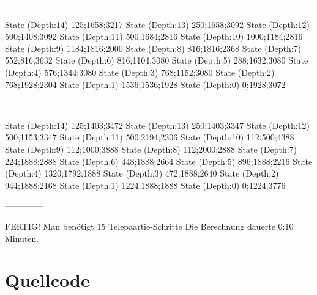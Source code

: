 \documentclass[a4paper,10pt,ngerman]{scrartcl}
\begin{document}
\begin{lstcs}
--------------

State (Depth:14) {125;1658;3217}
State (Depth:13) {250;1658;3092}
State (Depth:12) {500;1408;3092}
State (Depth:11) {500;1684;2816}
State (Depth:10) {1000;1184;2816}
State (Depth:9) {1184;1816;2000}
State (Depth:8) {816;1816;2368}
State (Depth:7) {552;816;3632}
State (Depth:6) {816;1104;3080}
State (Depth:5) {288;1632;3080}
State (Depth:4) {576;1344;3080}
State (Depth:3) {768;1152;3080}
State (Depth:2) {768;1928;2304}
State (Depth:1) {1536;1536;1928}
State (Depth:0) {0;1928;3072}

--------------

State (Depth:14) {125;1403;3472}
State (Depth:13) {250;1403;3347}
State (Depth:12) {500;1153;3347}
State (Depth:11) {500;2194;2306}
State (Depth:10) {112;500;4388}
State (Depth:9) {112;1000;3888}
State (Depth:8) {112;2000;2888}
State (Depth:7) {224;1888;2888}
State (Depth:6) {448;1888;2664}
State (Depth:5) {896;1888;2216}
State (Depth:4) {1320;1792;1888}
State (Depth:3) {472;1888;2640}
State (Depth:2) {944;1888;2168}
State (Depth:1) {1224;1888;1888}
State (Depth:0) {0;1224;3776}

--------------


FERTIG!
Man benötigt 15 Telepaartie-Schritte
Die Berechnung dauerte 0:10 Minuten.
\end{lstcs}

\section{Quellcode}
\end{document}
